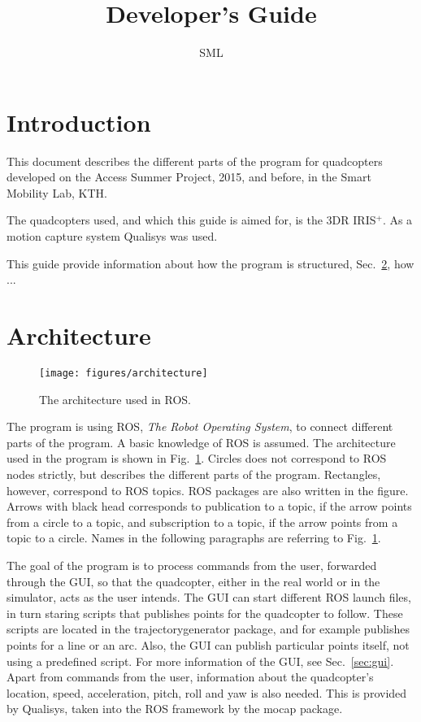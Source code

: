 \documentclass[titlepage,11pt,a4paper]{article}
\title{Developer's Guide}
\author{SML}
\begin{document}
\maketitle
\tableofcontents
\newpage

\section{Introduction}
This document describes the different parts of the program for
quadcopters developed on the Access Summer Project, 2015, and before,
in the Smart Mobility Lab, KTH.

The quadcopters used, and which this guide is aimed for, is the 3DR
IRIS$^+$. As a motion capture system Qualisys was used.

This guide provide information about how the program is structured,
Sec.~\ref{sec:architecture}, how ...


\section{Architecture}
\label{sec:architecture}

\begin{figure}[h!]                                                               
  \centering                                                                      
  \texttt{[image: figures/architecture]}                             
  \caption{The architecture used in ROS.}
  \label{fig:architecture}                                                              
\end{figure}

The program is using ROS, \textit{The Robot
  Operating System}, to connect different parts of the program. A
basic knowledge of ROS is assumed. The architecture used in the program is shown in
Fig.~\ref{fig:architecture}. Circles does not correspond to ROS nodes
strictly, but describes the different parts of the
program. Rectangles, however, correspond to ROS topics. ROS packages
are also written in the figure. Arrows with black head corresponds to
publication to a topic, if the arrow points from a circle to a topic,
and subscription to a topic, if the arrow points from a topic to a
circle. Names in the following paragraphs are referring to
Fig.~\ref{fig:architecture}.

The goal of the program is to process commands from the user,
forwarded through the GUI, so that the quadcopter, either in the real
world or in the simulator, acts as the user
intends. The GUI can
start different ROS launch files, in turn staring scripts that publishes points
for the quadcopter to follow. These scripts are located in the
trajectory\textunderscore generator package, and for example publishes
points for a line or an arc. Also, the GUI can publish particular
points itself, not using a predefined script. For more information of
the GUI, see Sec.~\ref{sec:gui}. Apart from commands from the user, information about the quadcopter's
location, speed, acceleration, pitch, roll and yaw is also
needed. This is provided by Qualisys, taken into the ROS framework by
the mocap package.
\end{document}
